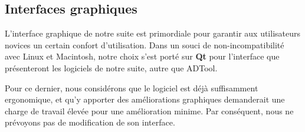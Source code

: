 	\subsection{Interfaces graphiques}
		L'interface graphique de notre suite est primordiale pour garantir aux utilisateurs novices un certain confort d'utilisation. Dans un souci de non-incompatibilité avec Linux et Macintosh, notre choix s'est porté sur {\bf Qt} pour l'interface que présenteront les logiciels de notre suite, autre que ADTool. 
		
		Pour ce dernier, nous considérons que le logiciel est déjà suffisamment ergonomique, et qu'y apporter des améliorations graphiques demanderait une charge de travail élevée pour une amélioration minime. Par conséquent, nous ne prévoyons pas de modification de son interface.
		




